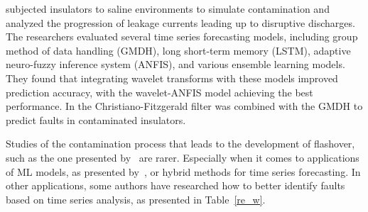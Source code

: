 \citet{s22166121} subjected insulators to saline environments to simulate contamination and analyzed the progression of leakage currents leading up to disruptive discharges. The researchers evaluated several time series forecasting models, including group method of data handling (GMDH), long short-term memory (LSTM), adaptive neuro-fuzzy inference system (ANFIS), and various ensemble learning models. They found that integrating wavelet transforms with these models improved prediction accuracy, with the wavelet-ANFIS model achieving the best performance. In \citep{s23136118} the Christiano-Fitzgerald filter was combined with the GMDH to predict faults in contaminated insulators.

Studies of the contamination process that leads to the development of flashover, such as the one presented by~\citet{9828523} are rarer. Especially when it comes to applications of ML models, as presented by~\citet{10587253}, or hybrid methods for time series forecasting. In other applications, some authors have researched how to better identify faults based on time series analysis, as presented in Table~\ref{re_w}.

